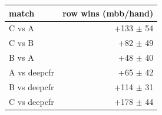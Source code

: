 \begin{tabular}{lr}
\toprule
match & row wins (mbb/hand) \\
\midrule
C vs A & +133 $\pm$ 54 \\
C vs B & +82 $\pm$ 49 \\
B vs A & +48 $\pm$ 40 \\
A vs deepcfr & +65 $\pm$ 42 \\
B vs deepcfr & +114 $\pm$ 31 \\
C vs deepcfr & +178 $\pm$ 44 \\
\bottomrule
\end{tabular}
